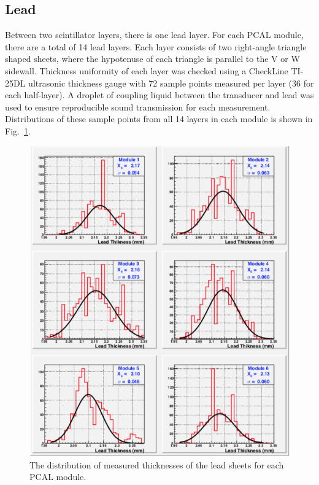 \subsection{Lead}

Between two scintillator layers, there is one lead layer. For each PCAL module, there are a total of 14 lead layers.
Each layer consists of two right-angle triangle shaped sheets, where the hypotenuse of each triangle is parallel to
the V or W sidewall. Thickness uniformity of each layer was checked using a CheckLine TI-25DL ultrasonic
thickness gauge with 72 sample points measured per layer (36 for each half-layer). A droplet of coupling liquid
between the transducer and lead was used to  ensure reproducible sound transmission for each measurement.
Distributions of these sample points from all 14 layers in each module is shown in Fig.~\ref{fig:S4_5}.

\begin{figure}[hbt]
\centering
\includegraphics[width=0.95\columnwidth,keepaspectratio]{img/S4_5.png}
\caption{The distribution of measured thicknesses of the lead sheets for each PCAL module.}
\label{fig:S4_5}
\end{figure}

